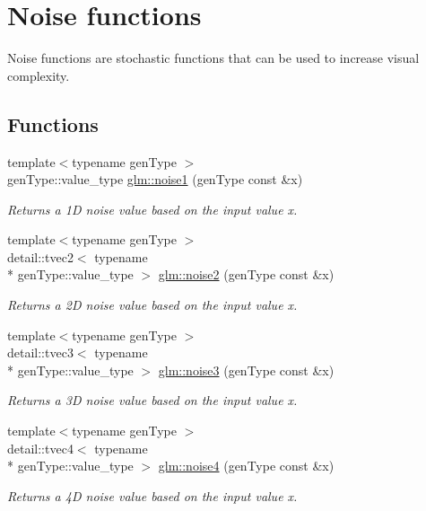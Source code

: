 \hypertarget{group__core__func__noise}{\section{Noise functions}
\label{group__core__func__noise}
}


Noise functions are stochastic functions that can be used to increase visual complexity.  


\subsection*{Functions}
\begin{DoxyCompactItemize}
\item 
{\footnotesize template$<$typename gen\-Type $>$ }\\gen\-Type\-::value\-\_\-type \hyperlink{group__core__func__noise_ga687ac48ae4591c0da916052e469aad74}{glm\-::noise1} (gen\-Type const \&x)
\begin{DoxyCompactList}\small\item\em Returns a 1\-D noise value based on the input value x. \end{DoxyCompactList}\item 
{\footnotesize template$<$typename gen\-Type $>$ }\\detail\-::tvec2$<$ typename \\*
gen\-Type\-::value\-\_\-type $>$ \hyperlink{group__core__func__noise_ga528fc75920119a7ab65ef6dccef28752}{glm\-::noise2} (gen\-Type const \&x)
\begin{DoxyCompactList}\small\item\em Returns a 2\-D noise value based on the input value x. \end{DoxyCompactList}\item 
{\footnotesize template$<$typename gen\-Type $>$ }\\detail\-::tvec3$<$ typename \\*
gen\-Type\-::value\-\_\-type $>$ \hyperlink{group__core__func__noise_gaf1589bc1859b8dc53d737ece36b59b85}{glm\-::noise3} (gen\-Type const \&x)
\begin{DoxyCompactList}\small\item\em Returns a 3\-D noise value based on the input value x. \end{DoxyCompactList}\item 
{\footnotesize template$<$typename gen\-Type $>$ }\\detail\-::tvec4$<$ typename \\*
gen\-Type\-::value\-\_\-type $>$ \hyperlink{group__core__func__noise_ga7b3cd0ab6f03142dd9ff3054e7fe5299}{glm\-::noise4} (gen\-Type const \&x)
\begin{DoxyCompactList}\small\item\em Returns a 4\-D noise value based on the input value x. \end{DoxyCompactList}\end{DoxyCompactItemize}


